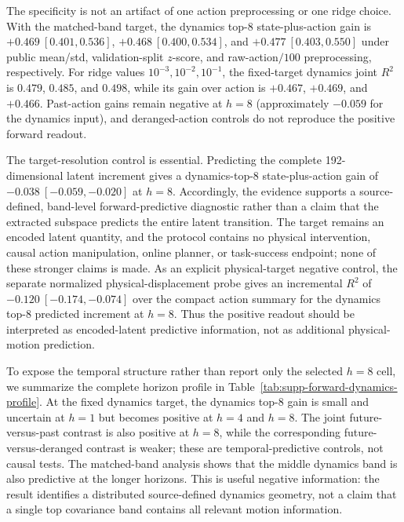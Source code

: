 \documentclass{article}
\begin{document}
The specificity is not an artifact of one action preprocessing or one ridge
choice. With the matched-band target, the dynamics top-8 state-plus-action
gain is $+0.469\ [0.401,0.536]$, $+0.468\ [0.400,0.534]$, and
$+0.477\ [0.403,0.550]$ under public mean/std, validation-split $z$-score,
and raw-action$/100$ preprocessing, respectively. For ridge values
$10^{-3},10^{-2},10^{-1}$, the fixed-target dynamics joint $R^2$ is
$0.479$, $0.485$, and $0.498$, while its gain over action is
$+0.467$, $+0.469$, and $+0.466$. Past-action gains remain negative at
$h=8$ (approximately $-0.059$ for the dynamics input), and deranged-action
controls do not reproduce the positive forward readout.

The target-resolution control is essential. Predicting the complete
192-dimensional latent increment gives a dynamics-top-8 state-plus-action
gain of $-0.038\ [-0.059,-0.020]$ at $h=8$. Accordingly, the evidence
supports a source-defined, band-level forward-predictive diagnostic rather
than a claim that the extracted subspace predicts the entire latent
transition. The target remains an encoded latent quantity, and the protocol
contains no physical intervention, causal action manipulation, online planner,
or task-success endpoint; none of these stronger claims is made.
As an explicit physical-target negative control, the separate normalized
physical-displacement probe gives an incremental $R^2$ of
$-0.120\ [-0.174,-0.074]$ over the compact action summary for the dynamics
top-8 predicted increment at $h=8$. Thus the positive readout should be
interpreted as encoded-latent predictive information, not as additional
physical-motion prediction.

To expose the temporal structure rather than report only the selected $h=8$
cell, we summarize the complete horizon profile in
Table~\ref{tab:supp-forward-dynamics-profile}. At the fixed dynamics target,
the dynamics top-8 gain is small and uncertain at $h=1$ but becomes positive
at $h=4$ and $h=8$. The joint future-versus-past contrast is also positive at
$h=8$, while the corresponding future-versus-deranged contrast is weaker;
these are temporal-predictive controls, not causal tests. The matched-band
analysis shows that the middle dynamics band is also predictive at the longer
horizons. This is useful negative information: the result identifies a
distributed source-defined dynamics geometry, not a claim that a single top
covariance band contains all relevant motion information.
\end{document}
